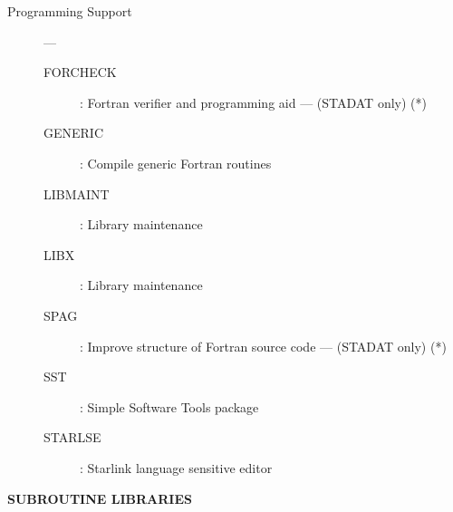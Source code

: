\begin{description}
\item [Programming Support] ---
\begin{description}
\item [FORCHECK] : Fortran verifier and programming aid --- (STADAT only) (*)
\item [GENERIC] : Compile generic Fortran routines
\item [LIBMAINT] : Library maintenance
\item [LIBX] : Library maintenance
\item [SPAG] : Improve structure of Fortran source code --- (STADAT only) (*)
\item [SST] : Simple Software Tools package
\item [STARLSE] : Starlink language sensitive editor
\end{description}

\end{description}

\begin{center}
{\bf\large SUBROUTINE LIBRARIES}
\end{center}

